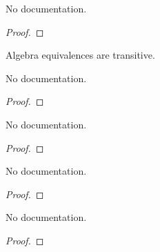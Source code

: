 \begin{theorem}\label{ValRingEquiv.toEquiv_symm}
        \leanok
                No documentation.
    \end{theorem}

\begin{proof}
    \leanok
\end{proof}

\begin{definition}\label{ValAlgEquiv.trans}
        \leanok
                Algebra equivalences are transitive.
    \end{definition}

\begin{theorem}\label{ValAlgEquiv.coe_trans}
        \leanok
                No documentation.
    \end{theorem}

\begin{proof}
    \leanok
\end{proof}

\begin{theorem}\label{ValAlgEquiv.trans_apply}
        \leanok
                No documentation.
    \end{theorem}

\begin{proof}
    \leanok
\end{proof}

\begin{theorem}\label{ValRingEquiv.refl_trans}
        \leanok
                No documentation.
    \end{theorem}

\begin{proof}
    \leanok
\end{proof}

\begin{theorem}\label{ValRingEquiv.trans_refl}
        \leanok
                No documentation.
    \end{theorem}

\begin{proof}
    \leanok
\end{proof}

